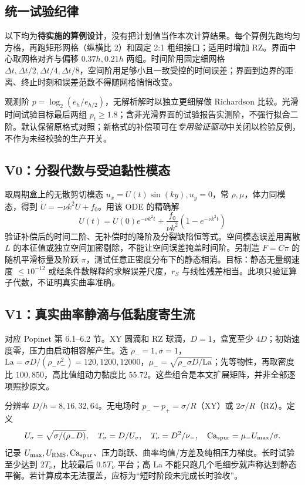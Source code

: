 \documentclass[UTF8,a4paper,11pt,fontset=fandol]{ctexart}
\numberwithin{equation}{section}
\newcommand{\dt}{\Delta t}\newcommand{\dd}{\,\mathrm d}
\begin{document}
\subsection{统一试验纪律}
以下均为\textbf{待实施的算例设计}，没有把计划值当作本次计算结果。每个算例先跑均匀方格，再跑矩形网格（纵横比 2）和固定 2:1 粗细接口；适用时增加 RZ。界面中心取网格对齐与偏移 $0.37h,0.21h$ 两组。时间阶用固定细网格 $\dt,\dt/2,\dt/4,\dt/8$，空间阶用足够小且一致受控的时间误差；界面到边界的距离、终止时刻和误差范数不得随网格悄悄改变。

观测阶 $p=\log_2(e_h/e_{h/2})$，无解析解时以独立更细解做 Richardson 比较。光滑时间试验目标最后两组 $p_t\ge1.8$；含非光滑界面的试验报告实测阶，不强行拟合二阶。默认保留原格式对照；新格式的补偿项可在\emph{专用验证驱动}中关闭以检验反例，不作为未经校验的生产开关。

\subsection{V0：分裂代数与受迫黏性模态}
取周期盒上的无散剪切模态 $u_x=U(t)\sin(ky),u_y=0$，常 $\rho,\mu$，体力同模态，得到 $\dot U=-\nu k^2U+f_0$。用该 ODE 的精确解
\begin{equation}
 U(t)=U(0)e^{-\nu k^2t}+\frac{f_0}{\nu k^2}(1-e^{-\nu k^2t})
\end{equation}
验证补偿后的时间二阶、无补偿时的降阶及分裂缺陷恒等式。空间模态误差用离散 $L$ 的本征值或独立空间加密剔除，不能让空间误差掩盖时间阶。另制造 $F=C\pi$ 的随机平滑标量及阶跃 $\pi$，测试任意正密度分布下的静态相消。目标：静态无量纲速度 $\le10^{-12}$ 或经条件数解释的求解误差尺度，$r_S$ 与线性残差相当。此项只验证算子代数，不证明真实曲率准确。

\subsection{V1：真实曲率静滴与低黏度寄生流}
对应 Popinet 第 6.1--6.2 节。XY 圆滴和 RZ 球滴，$D=1$，盒宽至少 $4D$；初始速度零，压力由启动相容解产生。选 $\rho_-=1,\sigma=1$，$\mathrm{La}=\sigma D/(\rho_-\nu_-^2)=120,1200,12000$，$\mu_-=\sqrt{\rho_-\sigma D/\mathrm{La}}$；先等物性，再取密度比 $100,850$，高比值组动力黏度比 $55.72$。这些组合是本文扩展矩阵，并非全部逐项照抄原文。

分辨率 $D/h=8,16,32,64$。无电场时 $p_--p_+=\sigma/R$（XY）或 $2\sigma/R$（RZ）。定义
\begin{equation}
 U_\sigma=\sqrt{\sigma/(\rho_-D)},\quad T_\sigma=D/U_\sigma,
 \quad T_\nu=D^2/\nu_-,\quad \mathrm{Ca}_{\rm spur}=\mu_-U_{\max}/\sigma.
\end{equation}
记录 $U_{\max},U_{\rm RMS},\mathrm{Ca}_{\rm spur}$、压力跳跃、曲率均值/方差及纯相压力梯度。长时试验至少达到 $2T_\nu$，比较最后 $0.5T_\nu$ 平台；高 La 不能只跑几个毛细步就声称达到静态平衡。若计算成本无法覆盖，应标为“短时阶段未完成长时验收”。
\end{document}
